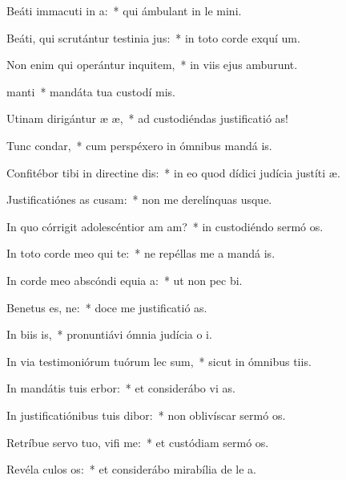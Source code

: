 \item Beáti immacuti in a:~* qui ámbulant in le mini.
\item Beáti, qui scrutántur testinia jus:~* in toto corde exquí um.
\item Non enim qui operántur inquitem,~* in viis ejus amburunt.
\item {} manti~* mandáta tua custodí mis.
\item Utinam dirigántur æ æ,~* ad custodiéndas justificatió as!
\item Tunc  condar,~* cum perspéxero in ómnibus mandá is.
\item Confitébor tibi in directine dis:~* in eo quod dídici judícia justíti æ.
\item Justificatiónes as cusam:~* non me derelínquas usque.
\item In quo córrigit adolescéntior am am?~* in custodiéndo sermó os.
\item In toto corde meo qui te:~* ne repéllas me a mandá is.
\item In corde meo abscóndi equia a:~* ut non pec bi.
\item Benetus es, ne:~* doce me justificatió as.
\item In biis is,~* pronuntiávi ómnia judícia o i.
\item In via testimoniórum tuórum lec sum,~* sicut in ómnibus tiis.
\item In mandátis tuis erbor:~* et considerábo vi as.
\item In justificatiónibus tuis dibor:~* non oblivíscar sermó os.
\item Retríbue servo tuo, vifi me:~* et custódiam sermó os.
\item Revéla culos os:~* et considerábo mirabília de le a.
